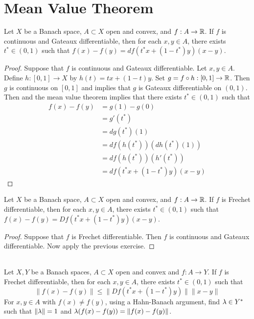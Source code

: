 \documentclass{book}
\begin{document}
	
	
	
	
	
	
	\newpage
	\section{Mean Value Theorem}	
	
	\begin{ex} 
	Let $X$ be a Banach space, $A \subset X$ open and convex, and $f:A \rightarrow \mathbb{R}$. If $f$ is continuous and Gateaux differentiable, then for each $x,y \in A$, there exists $t^* \in (0,1)$ such that $f(x) - f(y) = df(t^*x + (1-t^*)y)(x - y)$. 
	\end{ex}
	
	\begin{proof}
	Suppose that $f$ is continuous and Gateaux differentiable. Let $x,y \in A$. Define $h: [0,1] \rightarrow X$ by $h(t) = tx +(1-t)y$. Set $g = f \circ h: [0,1] \rightarrow \mathbb{R}$. Then $g$ is continuous on $[0,1]$ and  implies that $g$ is Gateaux differentiable on $(0,1)$. Then   and the mean value theorem implies that there exists $t^* \in (0,1)$ such that
	\begin{align*}
	f(x) - f(y)
	&= g(1) - g(0) \\
	&=g'(t^*) \\ 
	&= dg(t^*)(1) \\
	&= df(h(t^*))(dh(t^*)(1)) \\
	&= df(h(t^*))(h'(t^*)) \\
	&= df(t^*x + (1-t^*)y)(x -y)
	\end{align*}
	\end{proof}
	
	\begin{ex} 
	Let $X$ be a Banach space, $A \subset X$ open and convex, and $f:A \rightarrow \mathbb{R}$. If $f$ is Frechet differentiable, then for each $x,y \in A$, there exists $t^* \in (0,1)$ such that $f(x) - f(y) = Df(t^*x + (1-t^*)y)(x - y)$. 
	\end{ex}
	
	\begin{proof}
	Suppose that $f$ is Frechet differentiable. Then $f$ is continuous and Gateaux differentiable. Now apply the previous exercise.	
	\end{proof}
	
	\begin{ex} \\
	Let $X, Y$ be a Banach spaces, $A \subset X$ open and convex and $f:A \rightarrow Y$. If $f$ is Frechet differentiable, then for each $x,y \in A$, there exists $t^* \in (0,1)$ such that $$\|f(x) - f(y)\| \leq \|Df(t^*x + (1-t^*)y)\|\|x-y\|$$
	 For $x,y \in A$ with $f(x) \neq f(y)$, using a Hahn-Banach argument, find $\lambda \in Y^*$ such that $\|\lambda\| = 1 $ and $\lambda (f(x) - f(y)) = \|f(x) - f(y)\|$.
	\end{ex}
	
\end{document}

